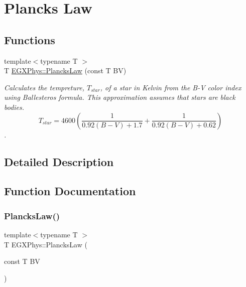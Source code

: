 \hypertarget{group___e_g_x_phys-_electrodynamics-_black_body-_plancks_law}{}\section{Planck\textquotesingle{}s Law}
\label{group___e_g_x_phys-_electrodynamics-_black_body-_plancks_law}
\subsection*{Functions}
\begin{DoxyCompactItemize}
\item 
{\footnotesize template$<$typename T $>$ }\\T \mbox{\hyperlink{group___e_g_x_phys-_electrodynamics-_black_body-_plancks_law_ga19d153ee38266e8e4fb2305281762434}{E\+G\+X\+Phys\+::\+Plancks\+Law}} (const T BV)
\begin{DoxyCompactList}\small\item\em Calculates the tempreture, $T_{star}$, of a star in Kelvin from the B-\/V color index using Ballesteros\textquotesingle{} formula. This approximation assumes that stars are black bodies. \[T_{star}=4600 \left ( \frac{1}{0.92 (B-V)+ 1.7} + \frac{1}{0.92 (B-V) + 0.62} \right )\]. \end{DoxyCompactList}\end{DoxyCompactItemize}


\subsection{Detailed Description}


\subsection{Function Documentation}
\mbox{\label{group___e_g_x_phys-_electrodynamics-_black_body-_plancks_law_ga19d153ee38266e8e4fb2305281762434}} 
\subsubsection{\texorpdfstring{Plancks\+Law()}{PlancksLaw()}}
{\footnotesize\ttfamily template$<$typename T $>$ \\
T E\+G\+X\+Phys\+::\+Plancks\+Law (\begin{DoxyParamCaption}\item[{const T}]{BV }\end{DoxyParamCaption})}



